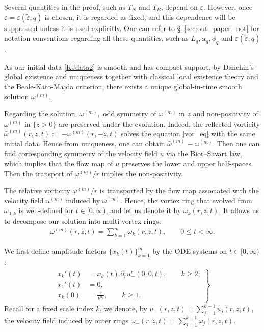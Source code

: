 \documentclass[reqno,11pt]{amsart}
\begin{document}
Several quantities in the proof, such as $T_N$ and $T_B$, depend on $\varepsilon$. 
However, once $\varepsilon=\varepsilon(\tilde\varepsilon,q)$ is chosen, it is regarded as fixed, and this dependence will be suppressed unless it is used explicitly.
One can refer to \S~\ref{sec:out_paper_not} for notation conventions regarding all these quantities, such as $L_q,\alpha_q,\phi_q$ and $\varepsilon(\tilde\varepsilon,q)$.

As our initial data \eqref{KJdata2} is smooth and has compact support, by Danchin's global existence and uniqueness \cite{Danchin07} together with classical local existence theory and the Beale-Kato-Majda criterion, there exists a unique global-in-time smooth solution $\omega^{(m)}$.

Regarding the solution, $\omega^{(m)},$ odd symmetry of $\omega^{(m)}$ in $z$ and non-positivity of $\omega^{(m)}$ in $\{z>0\}$ are preserved under the evolution. Indeed, the reflected vorticity $\bar \omega^{(m)}(r,z,t):= -\omega^{(m)}(r,-z,t)$ solves the equation \eqref{vor_eq} with the same initial data. Hence from uniqueness, one can obtain $\bar \omega^{(m)}\equiv \omega^{(m)}$. Then one can find corresponding symmetry of the velocity field $u$ via the Biot--Savart law, which implies that the flow map of $u$ preserves the lower and upper half-spaces. Then the transport of $\omega^{(m)}/r$ implies the non-positivity.

The relative vorticity $\omega^{(m)}/r$ is transported by the flow map associated with the velocity field $u^{(m)}$ induced by $\omega^{(m)}$. Hence, the vortex ring that evolved from $\omega_{0,k}$ is well-defined for $t\in [0,\infty)$, and let us denote it by $\omega_k(r,z,t)$. It allows us to decompose our solution into multi vortex rings:
    \begin{align}
    \label{eq:multi_vortex_ring_dec}
        \omega^{(m)}(r,z,t)
    =
        \sum_{k=1}^{m} \omega_k(r,z,t), \qquad 0\leq t <\infty.
    \end{align}





We first define amplitude factors $\{x_k(t)\}_{k=1}^m$ by the ODE systems on $t\in [0,\infty)$:
\begin{align}
    \label{EulerODE}
    \left. 
    \begin{aligned}
        x_k'(t)&= x_k(t)  \, \partial_r u_-^r (0,0,t), \qquad k\geq 2,
        \\
         x_1'(t)&=0,
        \\
        x_k(0)&= \frac{\varepsilon}{k^{\alpha_q}}, \qquad k\geq 1.
    \end{aligned}
    \right\}
    \end{align}
Recall for a fixed scale index $k$, we denote, by $u_-(r,z,t)=\sum_{j=1}^{k-1} u_j(r,z,t)$, the velocity field induced by outer rings $\omega_-(r,z,t)=\sum_{j=1}^{k-1} \omega_j(r,z,t)$.
\end{document}
